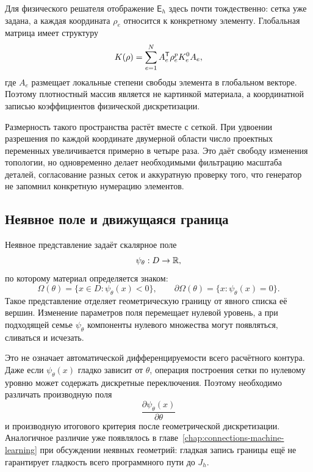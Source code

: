 Для физического решателя отображение $\mathsf E_h$ здесь почти тождественно: сетка уже задана, а каждая координата $\rho_e$ относится к конкретному элементу. Глобальная матрица имеет структуру
\begin{equation}
 K(\rho)
 =
 \sum_{e=1}^{N}
 A_e^{\mathsf{T}}
 \rho_e^p K_e^0
 A_e,
\end{equation}
где $A_e$ размещает локальные степени свободы элемента в глобальном векторе. Поэтому плотностный массив является не картинкой материала, а координатной записью коэффициентов физической дискретизации.

Размерность такого пространства растёт вместе с сеткой. При удвоении разрешения по каждой координате двумерной области число проектных переменных увеличивается примерно в четыре раза. Это даёт свободу изменения топологии, но одновременно делает необходимыми фильтрацию масштаба деталей, согласование разных сеток и аккуратную проверку того, что генератор не запомнил конкретную нумерацию элементов.

\subsection{Неявное поле и движущаяся граница}

Неявное представление задаёт скалярное поле
\begin{equation}
 \psi_\theta:D\to\mathbb{R},
\end{equation}
по которому материал определяется знаком:
\begin{equation}
 \Omega(\theta)
 =
 \{x\in D:\psi_\theta(x)<0\},
 \qquad
 \partial\Omega(\theta)
 =
 \{x:\psi_\theta(x)=0\}.
\end{equation}
Такое представление отделяет геометрическую границу от явного списка её вершин. Изменение параметров поля перемещает нулевой уровень, а при подходящей семье $\psi_\theta$ компоненты нулевого множества могут появляться, сливаться и исчезать.

Это не означает автоматической дифференцируемости всего расчётного контура. Даже если $\psi_\theta(x)$ гладко зависит от $\theta$, операция построения сетки по нулевому уровню может содержать дискретные переключения. Поэтому необходимо различать производную поля
\begin{equation}
 \frac{\partial\psi_\theta(x)}{\partial\theta}
\end{equation}
и производную итогового критерия после геометрической дискретизации. Аналогичное различие уже появлялось в главе~\ref{chap:connections-machine-learning} при обсуждении неявных геометрий: гладкая запись границы ещё не гарантирует гладкость всего программного пути до $J_h$.

